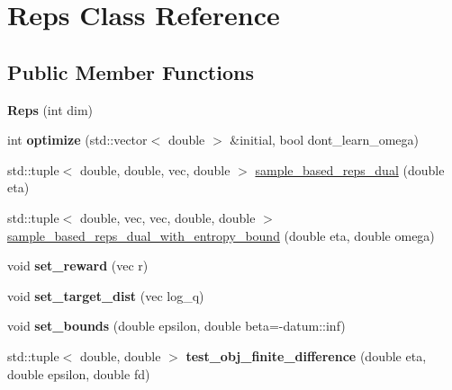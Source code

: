 \hypertarget{classReps}{}\section{Reps Class Reference}
\label{classReps}
\subsection*{Public Member Functions}
\begin{DoxyCompactItemize}
\item 
{\bfseries Reps} (int dim)\hypertarget{classReps_ac3458fbc515d23ea11a644414f23830b}{}\label{classReps_ac3458fbc515d23ea11a644414f23830b}

\item 
int {\bfseries optimize} (std\+::vector$<$ double $>$ \&initial, bool dont\+\_\+learn\+\_\+omega)\hypertarget{classReps_a0a262cae72447bce9d2fc79f871659de}{}\label{classReps_a0a262cae72447bce9d2fc79f871659de}

\item 
std\+::tuple$<$ double, double, vec, double $>$ \hyperlink{classReps_aa35a559a166ebb7f6a0e416838ae2cbd}{sample\+\_\+based\+\_\+reps\+\_\+dual} (double eta)
\item 
std\+::tuple$<$ double, vec, vec, double, double $>$ \hyperlink{classReps_af469d50c6929b8ab1aa4f16bd053a91d}{sample\+\_\+based\+\_\+reps\+\_\+dual\+\_\+with\+\_\+entropy\+\_\+bound} (double eta, double omega)
\item 
void {\bfseries set\+\_\+reward} (vec r)\hypertarget{classReps_a0d89163c1d612b8aa9b5c2a82d15f686}{}\label{classReps_a0d89163c1d612b8aa9b5c2a82d15f686}

\item 
void {\bfseries set\+\_\+target\+\_\+dist} (vec log\+\_\+q)\hypertarget{classReps_abf12e508670dc2f62a217ff1b99252fb}{}\label{classReps_abf12e508670dc2f62a217ff1b99252fb}

\item 
void {\bfseries set\+\_\+bounds} (double epsilon, double beta=-\/datum\+::inf)\hypertarget{classReps_a4ffc1d440d3c0a3916e17fd503158a83}{}\label{classReps_a4ffc1d440d3c0a3916e17fd503158a83}

\item 
std\+::tuple$<$ double, double $>$ {\bfseries test\+\_\+obj\+\_\+finite\+\_\+difference} (double eta, double epsilon, double fd)\hypertarget{classReps_a93c1c5e49396d8b57f0e78832d24dd55}{}\label{classReps_a93c1c5e49396d8b57f0e78832d24dd55}

\end{DoxyCompactItemize}

